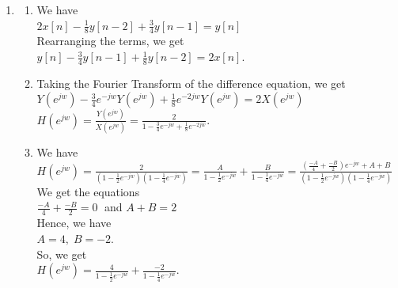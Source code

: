 \documentclass[10pt,a4paper, margin=1in]{article}
\begin{document}
\begin{enumerate}
\item %
	\begin{enumerate}
    \item %
    We have\vspace{0.3cm}\\
    $2x[n]-\frac{1}{8}y[n-2]+\frac{3}{4}y[n-1]=y[n]$\vspace{0.3cm}\\
    Rearranging the terms, we get\vspace{0.3cm}\\
    $y[n]-\frac{3}{4}y[n-1]+\frac{1}{8}y[n-2] = 2x[n]$.\vspace{0.3cm}\\
    \item %
    Taking the Fourier Transform of the difference equation, we get\vspace{0.3cm}\\
    $Y(e^{jw})-\frac{3}{4}e^{-jw}Y(e^{jw})+\frac{1}{8}e^{-2jw}Y(e^{jw}) = 2X(e^{jw})$\vspace{0.3cm}\\
    $H(e^{jw}) = \frac{Y(e^{jw})}{X(e^{jw})} = \frac{2}{1-\frac{3}{4}e^{-jw}+\frac{1}{8}e^{-2jw}}.$\vspace{0.3cm}\\
	\item %
	We have\vspace{0.3cm}\\
    $H(e^{jw}) = \frac{2}{(1-\frac{1}{2}e^{-jw})(1-\frac{1}{4}e^{-jw})} = \frac{A}{1-\frac{1}{2}e^{-jw}}+\frac{B}{1-\frac{1}{4}e^{-jw}} = \frac{(\frac{-A}{4}+\frac{-B}{2})e^{-jw}+A+B}{(1-\frac{1}{2}e^{-jw})(1-\frac{1}{4}e^{-jw})}$\vspace{0.3cm}\\
    We get the equations\vspace{0.3cm}\\
    $\frac{-A}{4}+\frac{-B}{2} = 0\;$ and $A+B=2$\vspace{0.3cm}\\
    Hence, we have\vspace{0.3cm}\\
    $A=4,\; B=-2.$\vspace{0.3cm}\\
    So, we get\vspace{0.3cm}\\
    $H(e^{jw}) = \frac{4}{1-\frac{1}{2}e^{-jw}}+\frac{-2}{1-\frac{1}{4}e^{-jw}}.$\vspace{0.3cm}\\

\end{enumerate}
\end{enumerate}
\end{document}
